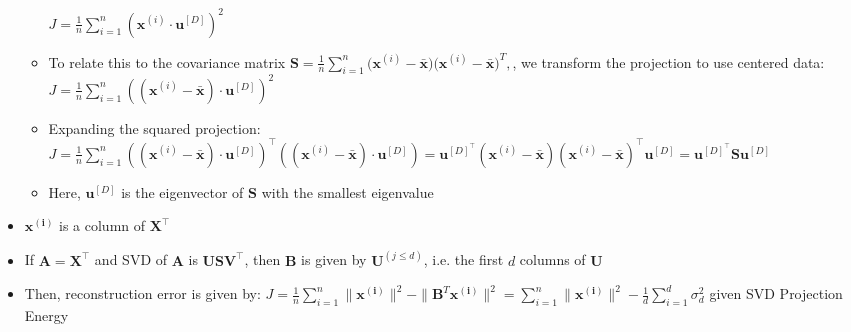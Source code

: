 \begin{itemize}
\begin{itemize}
        $
        J = \frac{1}{n} \sum_{i=1}^n (\boldsymbol{x}^{(i)} \cdot \boldsymbol{u}^{[D]})^2
        $
        \item To relate this to the covariance matrix 
        $
        \boldsymbol{S} = \frac{1}{n} \sum_{i=1}^n \big(\boldsymbol{x}^{(i)} - \bar{\boldsymbol{x}}\big) \big(\boldsymbol{x}^{(i)} - \bar{\boldsymbol{x}}\big)^T,
        $, we transform the projection to use centered data:
        $
        J = \frac{1}{n} \sum_{i=1}^n ((\boldsymbol{x}^{(i)} - \bar{\boldsymbol{x}}) \cdot \boldsymbol{u}^{[D]})^2
        $
        \item Expanding the squared projection:
        $
        J = \frac{1}{n} \sum_{i=1}^n ((\boldsymbol{x}^{(i)} - \bar{\boldsymbol{x}}) \cdot \boldsymbol{u}^{[D]})^\intercal ((\boldsymbol{x}^{(i)} - \bar{\boldsymbol{x}}) \cdot \boldsymbol{u}^{[D]}) = \boldsymbol{u}^{[D]}^\intercal (\boldsymbol{x}^{(i)} - \bar{\boldsymbol{x}}) (\boldsymbol{x}^{(i)} - \bar{\boldsymbol{x}})^\intercal \boldsymbol{u}^{[D]} = \boldsymbol{u}^{[D]}^\intercal \boldsymbol{S} \boldsymbol{u}^{[D]}
        $
        \item Here, $\boldsymbol{u}^{[D]}$ is the eigenvector of $\boldsymbol{S}$ with the smallest eigenvalue
    \end{itemize}
    \item $\boldsymbol{x^{(i)}}$ is a column of $\boldsymbol{X}^\intercal$
    \item If $\boldsymbol{A} = \boldsymbol{X}^\intercal$ and SVD of $\boldsymbol{A}$ is $\boldsymbol{U}\boldsymbol{S}\boldsymbol{V}^\intercal$, then $\boldsymbol{B}$ is given by $\boldsymbol{U}^{(j \leq d)}$, i.e. the first $d$ columns of $\boldsymbol{U}$
    \item Then, reconstruction error is given by: $J = \frac{1}{n} \sum_{i=1}^n \| \boldsymbol{x^{(i)}} \|^2 - \| \boldsymbol{B}^T \boldsymbol{x^{(i)}} \|^2 =\sum_{i=1}^n \| \boldsymbol{x^{(i)}} \|^2 - \frac{1}{d} \sum_{i=1}^d \sigma_d^2$ given SVD Projection Energy
\end{itemize}
